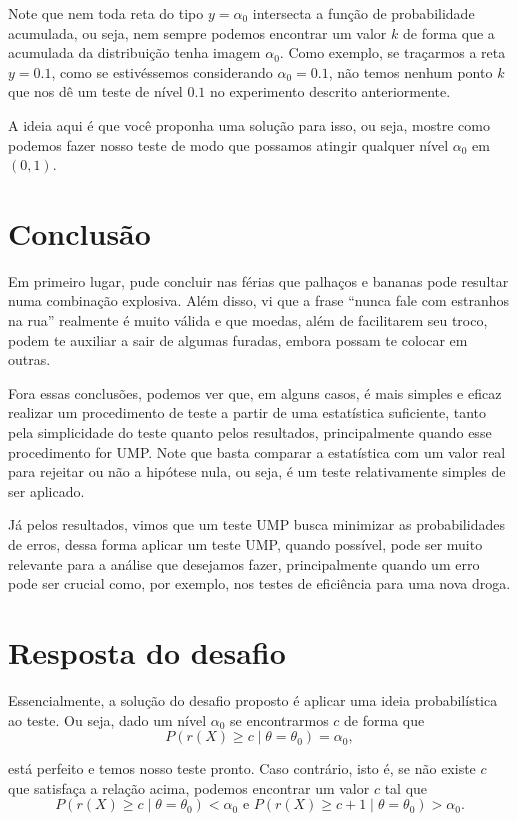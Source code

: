 \documentclass{article}
\begin{document}
Note que nem toda reta do tipo $y = \alpha_0$ intersecta a função de probabilidade acumulada, ou seja, nem sempre podemos encontrar um valor $k$ de forma que a acumulada da distribuição tenha imagem $\alpha_0$. Como exemplo, se traçarmos a reta $y = 0.1$, como se estivéssemos considerando $\alpha_0 = 0.1$, não temos nenhum ponto $k$ que nos dê um teste de nível $0.1$ no experimento descrito anteriormente.

A ideia aqui é que você proponha uma solução para isso, ou seja, mostre como podemos fazer nosso teste de modo que possamos atingir qualquer nível $\alpha_0$ em $(0, 1)$.

\section*{Conclusão}

Em primeiro lugar, pude concluir nas férias que palhaços e bananas pode resultar numa combinação explosiva. Além disso, vi que a frase ``nunca fale com estranhos na rua'' realmente é muito válida e que moedas, além de facilitarem seu troco, podem te auxiliar a sair de algumas furadas, embora possam te colocar em outras.

Fora essas conclusões, podemos ver que, em alguns casos, é mais simples e eficaz realizar um procedimento de teste a partir de uma estatística suficiente, tanto pela simplicidade do teste quanto pelos resultados, principalmente quando esse procedimento for UMP. Note que basta comparar a estatística com um valor real para rejeitar ou não a hipótese nula, ou seja, é um teste relativamente simples de ser aplicado.

Já pelos resultados, vimos que um teste UMP busca minimizar as probabilidades de erros, dessa forma aplicar um teste UMP, quando possível, pode ser muito relevante para a análise que desejamos fazer, principalmente quando um erro pode ser crucial como, por exemplo, nos testes de eficiência para uma nova droga.

\section*{Resposta do desafio}

Essencialmente, a solução do desafio proposto é aplicar uma ideia probabilística ao teste. Ou seja, dado um nível $\alpha_0$ se encontrarmos $c$ de forma que
\[P(r(X) \geq c \mid \theta = \theta_0) = \alpha_0,\]

\noindent está perfeito e temos nosso teste pronto. Caso contrário, isto é, se não existe $c$ que satisfaça a relação acima, podemos encontrar um valor $c$ tal que
\[P(r(X) \geq c \mid \theta = \theta_0) < \alpha_0 \text{ e } P(r(X) \geq c + 1 \mid \theta = \theta_0) > \alpha_0.\]
\end{document}
